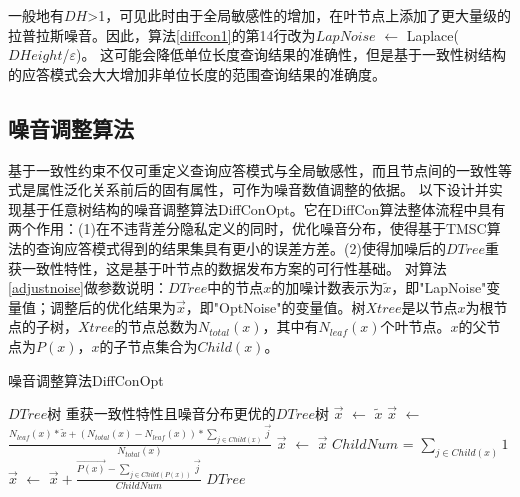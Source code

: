 一般地有$DH$>1，可见此时由于全局敏感性的增加，在叶节点上添加了更大量级的拉普拉斯噪音。因此，算法\ref{diffcon1}的第14行改为$LapNoise$ $\leftarrow$ Laplace($DHeight$/$\varepsilon$)。
这可能会降低单位长度查询结果的准确性，但是基于一致性树结构的应答模式会大大增加非单位长度的范围查询结果的准确度。



\subsection{噪音调整算法}

基于一致性约束不仅可重定义查询应答模式与全局敏感性，而且节点间的一致性等式是属性泛化关系前后的固有属性，可作为噪音数值调整的依据。
以下设计并实现基于任意树结构的噪音调整算法DiffConOpt。它在DiffCon算法整体流程中具有两个作用：(1)在不违背差分隐私定义的同时，优化噪音分布，使得基于TMSC算法的查询应答模式得到的结果集具有更小的误差方差。(2)使得加噪后的$DTree$重获一致性特性，这是基于叶节点的数据发布方案的可行性基础。
对算法\ref{adjustnoise}做参数说明：$DTree$中的节点$x$的加噪计数表示为$\tilde{x}$，即"LapNoise"变量值；调整后的优化结果为$\vec{x}$，即"OptNoise"的变量值。树$Xtree$是以节点$x$为根节点的子树，$Xtree$的节点总数为$N_{total}(x)$，其中有$N_{leaf}(x)$个叶节点。$x$的父节点为$P(x)$，$x$的子节点集合为$Child(x)$。
\begin{algorithm}
	\caption{噪音调整算法DiffConOpt} 
	\label{adjustnoise}
	\begin{algorithmic}[1]
		\REQUIRE $DTree$树
		\ENSURE 重获一致性特性且噪音分布更优的$DTree$树
		\STATE $\vec{x}$ $\leftarrow$ $\tilde{x}$ 
		\ELSE
		\STATE  $\vec{x}$ $\leftarrow$ $\frac{{N_{leaf}(x) * \tilde{x} + (N_{total}(x) - N_{leaf}(x)) * \sum\nolimits_{j \in Child(x)} {\vec{j}}}}{{N_{total}(x)}}$
		\ENDIF
		\ENDFOR
		\STATE  $\vec{x}$ $\leftarrow$ $\vec{x}$
		\ELSE
		\STATE  $ChildNum$ = ${\sum\nolimits_{j \in Child(x)} {1}}$
		\STATE  $\vec{x}$ $\leftarrow$ $\vec{x} + \frac{{\overrightarrow{P(x)} - \sum\nolimits_{j \in Child(P(x))} {\vec{j}}}}{ChildNum}$
		\ENDIF
		\ENDFOR
		\RETURN $DTree$
	\end{algorithmic}
\end{algorithm}


